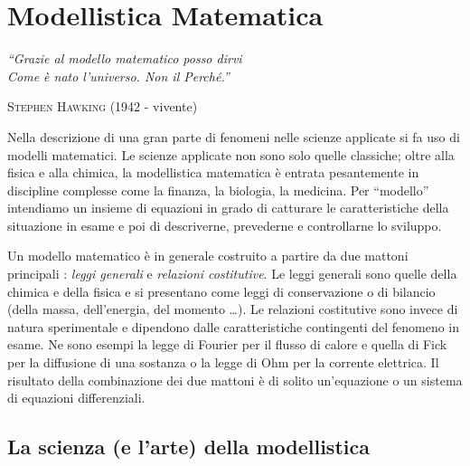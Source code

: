 \chapter{Modellistica Matematica}\label{ch:math}

\begin{flushright}
\textit{``Grazie al modello matematico posso dirvi\\ Come è nato l'universo. Non il Perché.''}
\end{flushright}
\begin{flushright} \textsc{Stephen Hawking} (1942 - vivente) \end{flushright} 
\begin{flushright} { } \end{flushright}

Nella descrizione di una gran parte di fenomeni nelle scienze applicate si fa uso di modelli matematici. Le scienze applicate non sono solo quelle classiche; oltre alla fisica e alla chimica, la modellistica matematica è entrata pesantemente in discipline complesse come la finanza, la biologia, la medicina. Per ``modello'' intendiamo un insieme di equazioni in grado di catturare le caratteristiche della situazione in esame e poi di descriverne, prevederne e controllarne lo sviluppo.

Un modello matematico è in generale costruito a partire da due mattoni principali \cite{salsa}: \textit{leggi generali} e \textit{relazioni costitutive}. Le leggi generali sono quelle della chimica e della fisica e si presentano come leggi di conservazione o di bilancio (della massa, dell'energia, del momento \ldots). Le relazioni costitutive sono invece di natura sperimentale e dipendono dalle caratteristiche contingenti del fenomeno in esame. Ne sono esempi la legge di Fourier per il flusso di calore e quella di Fick per la diffusione di una sostanza o la legge di Ohm per la corrente elettrica. Il risultato della combinazione dei due mattoni è di solito un'equazione o un sistema di equazioni differenziali.	


\section{La scienza (e l'arte) della modellistica}

